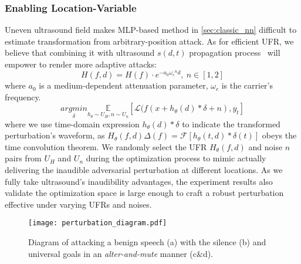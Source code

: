 \subsubsection{Enabling Location-Variable} 
Uneven ultrasound field makes MLP-based method in \textsection\ref{sec:classic_nn} difficult to estimate transformation from arbitrary-position attack. As for efficient UFR, we believe that combining it with ultrasound $s(d,t)$ propagation process~\cite{holm2019waves} will empower to render more adaptive attacks:
\begin{equation}\label{equ:dis_filter}
    H(f,d) = H(f)\cdot e^{-a_0{\omega_c}^n d},~n\in[1,2]
\end{equation}
where $a_0$ is a medium-dependent attenuation parameter, $\omega_c$ is the carrier's frequency.
\begin{equation}
    \underset{\delta}{argmin} \underset{h_{\theta} \sim U_H, n \sim U_n}{\mathbb{E}}\left[\mathcal{L}(f(x+h_{\theta}(d)\ast\delta+n), y_t\right]
\end{equation}
where we use time-domain expression $h_{\theta}(d)\ast\delta$ to indicate the transformed perturbation's waveform, as $H_{\theta}(f,d)\Delta(f)=\mathcal{F}[h_{\theta}(t,d)\ast\delta(t)]$ obeys the time convolution theorem.
We randomly select the UFR $H_{\theta}(f,d)$ and noise $n$ pairs from $U_H$ and $U_n$ during the optimization process to mimic actually delivering the inaudible adversarial perturbation at different locations. 
As we fully take ultrasound's inaudibility advantages, the experiment results also validate the optimization space is large enough to craft a robust perturbation effective under varying UFRs and noises.

 
\begin{figure*}[t]
	\centering
	\texttt{[image: perturbation\_diagram.pdf]}
        \vspace{-7pt}
	\caption{Diagram of \alias attacking a benign speech (a) with the silence (b) and universal goals in an \textit{alter-and-mute} manner (c\&d).}    %
	\label{fig:design_attack}    %
	\vspace{-15pt}
\end{figure*}

